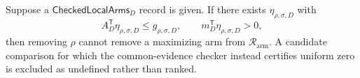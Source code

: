 Suppose a \(\mathsf{CheckedLocalArms}_D\) record is given.  If there exists \(\eta_{\rho,\sigma,D}\) with
\[
A_D^{\mathsf T}\eta_{\rho,\sigma,D}
\leq g_{\rho,\sigma,D},
\qquad
m_D^{\mathsf T}\eta_{\rho,\sigma,D}>0,
\]
then removing \(\rho\) cannot remove a maximizing arm from \(\mathcal R_{\mathrm{arm}}\).  A candidate comparison for which the common-evidence checker instead certifies uniform zero is excluded as undefined rather than ranked.